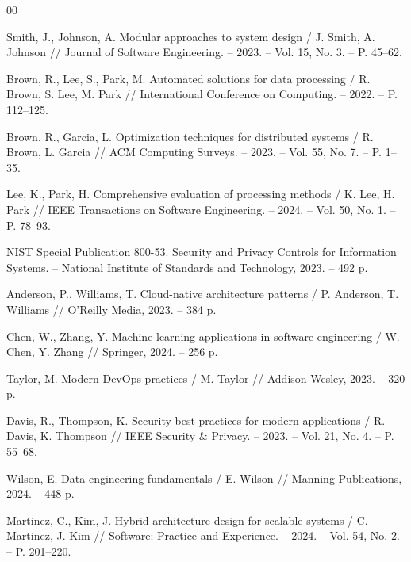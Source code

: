 \begingroup
\renewcommand{\section}[2]{\anonsection{Bibliography}}
\begin{thebibliography}{00}

    Smith, J., Johnson, A.
    Modular approaches to system design /
    J. Smith, A. Johnson //
    Journal of Software Engineering. -- 2023. -- Vol. 15, No. 3. -- P. 45--62.

    Brown, R., Lee, S., Park, M.
    Automated solutions for data processing /
    R. Brown, S. Lee, M. Park //
    International Conference on Computing. -- 2022. -- P. 112--125.

    Brown, R., Garcia, L.
    Optimization techniques for distributed systems /
    R. Brown, L. Garcia //
    ACM Computing Surveys. -- 2023. -- Vol. 55, No. 7. -- P. 1--35.

    Lee, K., Park, H.
    Comprehensive evaluation of processing methods /
    K. Lee, H. Park //
    IEEE Transactions on Software Engineering. -- 2024. -- Vol. 50, No. 1. -- P. 78--93.

    NIST Special Publication 800-53.
    Security and Privacy Controls for Information Systems. --
    National Institute of Standards and Technology, 2023. -- 492 p.

    Anderson, P., Williams, T.
    Cloud-native architecture patterns /
    P. Anderson, T. Williams //
    O'Reilly Media, 2023. -- 384 p.

    Chen, W., Zhang, Y.
    Machine learning applications in software engineering /
    W. Chen, Y. Zhang //
    Springer, 2024. -- 256 p.

    Taylor, M.
    Modern DevOps practices /
    M. Taylor //
    Addison-Wesley, 2023. -- 320 p.

    Davis, R., Thompson, K.
    Security best practices for modern applications /
    R. Davis, K. Thompson //
    IEEE Security \& Privacy. -- 2023. -- Vol. 21, No. 4. -- P. 55--68.

    Wilson, E.
    Data engineering fundamentals /
    E. Wilson //
    Manning Publications, 2024. -- 448 p.

    Martinez, C., Kim, J.
    Hybrid architecture design for scalable systems /
    C. Martinez, J. Kim //
    Software: Practice and Experience. -- 2024. -- Vol. 54, No. 2. -- P. 201--220.


\end{thebibliography}
